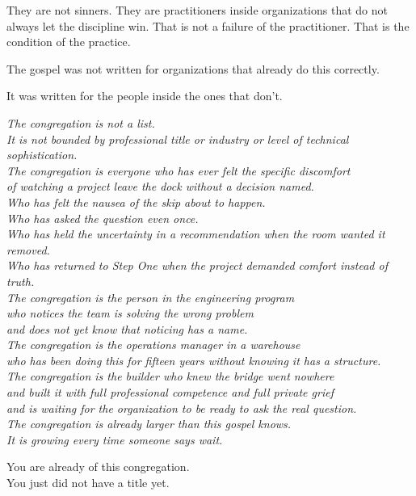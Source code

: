 They are not sinners. They are practitioners inside organizations that do not always let the discipline win. That is not a failure of the practitioner. That is the condition of the practice.

The gospel was not written for organizations that already do this correctly.

It was written for the people inside the ones that don't.

\vspace{2em}
\begin{center}
  \itshape The congregation is not a list.\\
  It is not bounded by professional title or industry or level of technical sophistication.\\
  The congregation is everyone who has ever felt the specific discomfort\\
  of watching a project leave the dock without a decision named.\\
  Who has felt the nausea of the skip about to happen.\\
  Who has asked the question even once.\\
  Who has held the uncertainty in a recommendation when the room wanted it removed.\\
  Who has returned to Step One when the project demanded comfort instead of truth.\\[1em]
  The congregation is the person in the engineering program\\
  who notices the team is solving the wrong problem\\
  and does not yet know that noticing has a name.\\[1em]
  The congregation is the operations manager in a warehouse\\
  who has been doing this for fifteen years without knowing it has a structure.\\[1em]
  The congregation is the builder who knew the bridge went nowhere\\
  and built it with full professional competence and full private grief\\
  and is waiting for the organization to be ready to ask the real question.\\[1em]
  The congregation is already larger than this gospel knows.\\
  It is growing every time someone says wait.
\end{center}

\vspace{1.5em}
\begin{center}
  You are already of this congregation.\\
  You just did not have a title yet.
\end{center}
